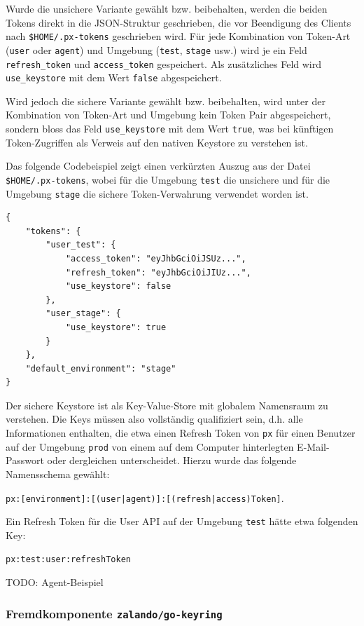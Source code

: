 Wurde die unsichere Variante gewählt bzw. beibehalten, werden die beiden Tokens direkt in die JSON-Struktur geschrieben, die vor Beendigung des Clients nach \texttt{\$HOME/.px-tokens} geschrieben wird. Für jede Kombination von Token-Art (\texttt{user} oder \texttt{agent}) und Umgebung (\texttt{test}, \texttt{stage} usw.) wird je ein Feld \texttt{refresh\_token} und \texttt{access\_token} gespeichert. Als zusätzliches Feld wird \texttt{use\_keystore} mit dem Wert \texttt{false} abgespeichert.

Wird jedoch die sichere Variante gewählt bzw. beibehalten, wird unter der Kombination von Token-Art und Umgebung kein Token Pair abgespeichert, sondern bloss das Feld \texttt{use\_keystore} mit dem Wert \texttt{true}, was bei künftigen Token-Zugriffen als Verweis auf den nativen Keystore zu verstehen ist.

Das folgende Codebeispiel zeigt einen verkürzten Auszug aus der Datei \texttt{\$HOME/.px-tokens}, wobei für die Umgebung \texttt{test} die unsichere und für die Umgebung \texttt{stage} die sichere Token-Verwahrung verwendet worden ist.

\begin{lstlisting}[caption={Die JSON-Struktur für den Keystore (Auszug)}]
{
	"tokens": {
		"user_test": {
			"access_token": "eyJhbGciOiJSUz...",
			"refresh_token": "eyJhbGciOiJIUz...",
			"use_keystore": false
		},
		"user_stage": {
			"use_keystore": true
		}
	},
	"default_environment": "stage"
}
\end{lstlisting}

Der sichere Keystore ist als Key-Value-Store mit globalem Namensraum zu verstehen. Die Keys müssen also vollständig qualifiziert sein, d.h. alle Informationen enthalten, die etwa einen Refresh Token von \texttt{px} für einen Benutzer auf der Umgebung \texttt{prod} von einem auf dem Computer hinterlegten E-Mail-Passwort oder dergleichen unterscheidet. Hierzu wurde das folgende Namensschema gewählt:

\texttt{px:[environment]:[(user|agent)]:[(refresh|access)Token]}.

Ein Refresh Token für die User API auf der Umgebung \texttt{test} hätte etwa folgenden Key:

\texttt{px:test:user:refreshToken}

TODO: Agent-Beispiel

\subsubsection{Fremdkomponente \texttt{zalando/go-keyring}}

